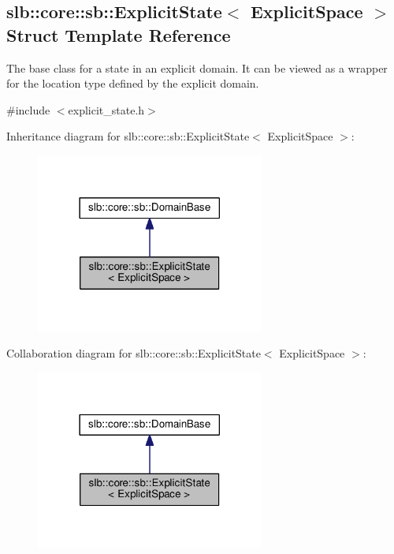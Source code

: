 \hypertarget{structslb_1_1core_1_1sb_1_1ExplicitState}{}\subsection{slb\+:\+:core\+:\+:sb\+:\+:Explicit\+State$<$ Explicit\+Space $>$ Struct Template Reference}
\label{structslb_1_1core_1_1sb_1_1ExplicitState}


The base class for a state in an explicit domain. It can be viewed as a wrapper for the location type defined by the explicit domain.  




{\ttfamily \#include $<$explicit\+\_\+state.\+h$>$}



Inheritance diagram for slb\+:\+:core\+:\+:sb\+:\+:Explicit\+State$<$ Explicit\+Space $>$\+:\nopagebreak
\begin{figure}[H]
\begin{center}
\leavevmode
\includegraphics[width=213pt]{structslb_1_1core_1_1sb_1_1ExplicitState__inherit__graph}
\end{center}
\end{figure}


Collaboration diagram for slb\+:\+:core\+:\+:sb\+:\+:Explicit\+State$<$ Explicit\+Space $>$\+:\nopagebreak
\begin{figure}[H]
\begin{center}
\leavevmode
\includegraphics[width=213pt]{structslb_1_1core_1_1sb_1_1ExplicitState__coll__graph}
\end{center}
\end{figure}
